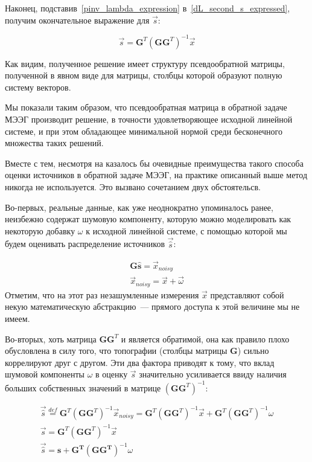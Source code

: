 Наконец, подставив~\ref{pinv_lambda_expression} в~\ref{dL_second_s_expressed}, получим
окончательное выражение для $\vec{s}$:

\begin{equation}
    \vec{s} = \mathbf{G}^T{(\mathbf{GG}^T)}^{-1}\vec{x}
\end{equation}

Как видим, полученное решение имеет структуру псевдообратной матрицы,
полученной в явном виде для матрицы, столбцы которой образуют полную систему
векторов.

Мы показали таким образом, что псевдообратная матрица в обратной задаче МЭЭГ
производит решение, в точности удовлетворяющее исходной линейной системе, и при
этом обладающее минимальной нормой среди бесконечного множества таких решений.

Вместе с тем, несмотря на казалось бы очевидные преимущества такого способа
оценки источников в обратной задаче МЭЭГ, на практике описанный выше метод
никогда не используется. Это вызвано сочетанием двух обстоятельсв. 

Во-первых, реальные данные, как уже неоднократно упоминалось ранее, неизбежно
содержат шумовую компоненту, которую можно моделировать как некоторую добавку
$\omega$ к исходной линейной системе, с помощью которой мы будем оценивать
распределение источников $\vec{\hat{s}}$:

\begin{gather}
    \mathbf{G\hat{s}} = \vec{x}_{noisy}
    \label{original_linear_w_noise}\\
    \vec{x}_{noisy} = \vec{x} + \vec{\omega}
\end{gather}
Отметим, что на этот раз незашумленные измерения $\vec{x}$ представляют
собой некую математическую абстракцию~--- прямого доступа к этой величине мы
не имеем.

Во-вторых, хоть матрица $\mathbf{G}\mathbf{G}^T$ и является обратимой, она как
правило плохо обусловлена в силу того, что топографии (столбцы матрицы
$\mathbf{G}$) сильно коррелируют друг с другом.  Эти два фактора
приводят к тому, что вклад шумовой компоненты $\omega$ в оценку $\vec{s}$
значительно усиливается ввиду наличия больших собственных значений в матрице
${(\mathbf{G}\mathbf{G}^T)}^{-1}$:

\begin{gather*}
    \vec{\hat{s}} \stackrel{def}{=} \mathbf{G}^T{(\mathbf{G}\mathbf{G}^T)}^{-1}\vec{x}_{noisy} = 
    \mathbf{G}^T{(\mathbf{G}\mathbf{G}^T)}^{-1}\vec{x} +
    \mathbf{G}^T{(\mathbf{G}\mathbf{G}^T)}^{-1}\omega\\
    \vec{s} = \mathbf{G}^T{(\mathbf{G}\mathbf{G}^T)}^{-1}\vec{x}
    \\
    \vec{\hat{s}} =  \mathbf{s + G^T{(GG^T)}}^{-1}\omega
\end{gather*}

